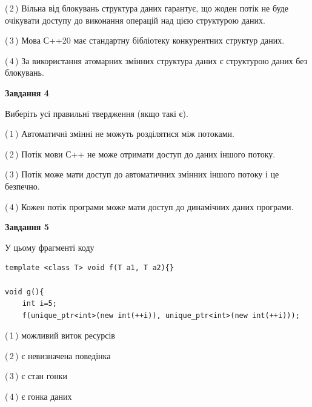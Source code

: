 \documentclass[12pt, ukrainian]{article}
\begin{document}
\begin {large}
{(\,2\,) Вільна від блокувань структура даних гарантує, що жоден потік не буде очікувати доступу до виконання операцій над цією структурою даних.%

(\,3\,) Мова С++20 має стандартну бібліотеку конкурентних структур даних.%

(\,4\,) За використання атомарних змінних структура даних є структурою даних без блокувань.%



\begin{center}
\textbf{Завдання 4}
\end{center}
Виберіть усі правильні твердження (якщо такі є).\par
\vspace{2mm}

(\,1\,) Автоматичні змінні не можуть розділятися між потоками.%

(\,2\,) Потік мови С++ не може отримати доступ до даних іншого потоку.%

(\,3\,) Потік може мати доступ до автоматичних змінних іншого потоку і це безпечно.%

(\,4\,) Кожен потік програми може мати доступ до динамічних даних програми.%



\begin{center}
\textbf{Завдання 5}
\end{center}
У цьому фрагменті коду
\begin{verbatim}
template <class T> void f(T a1, T a2){}

void g(){
    int i=5;
    f(unique_ptr<int>(new int(++i)), unique_ptr<int>(new int(++i)));
\end{verbatim}

(\,1\,) можливий виток ресурсів%

(\,2\,) є невизначена поведінка%

(\,3\,) є стан гонки%

(\,4\,) є гонка даних%


}
\end {large}
\end{document}
